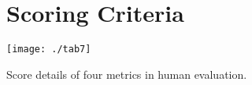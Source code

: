 \documentclass[11pt,a4paper]{article}
\begin{document}
	
	
	
	\clearpage
	\appendix
	\section{Scoring Criteria}
	\begin{table}[!hbt]
		\centering
		\texttt{[image: ./tab7]}
		\caption{Score details of four metrics in human evaluation.}
		\label{tab:criteria}
	\end{table}
	
\end{document}
